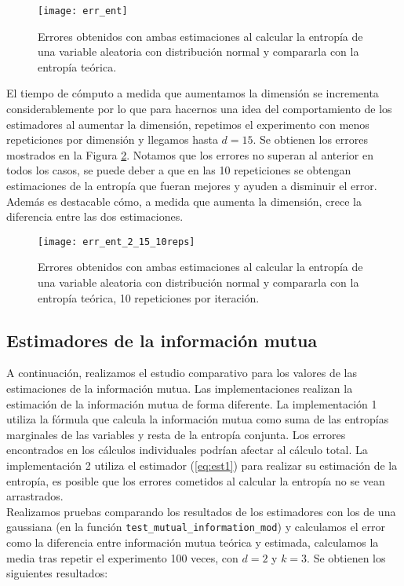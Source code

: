 \documentclass[12pt,a4paper]{report} %
\theoremstyle{definition}
\begin{document}
\begin{figure}[!htb]
    \centering
    \texttt{[image: err\_ent]}
    \caption{Errores obtenidos con ambas estimaciones al calcular la entropía de una variable aleatoria con distribución normal y compararla con la entropía teórica.}
    \label{fig:err_ent}
\end{figure}

El tiempo de cómputo a medida que aumentamos la dimensión se incrementa considerablemente por lo que para hacernos una idea del comportamiento de los estimadores al aumentar la dimensión, repetimos el experimento con menos repeticiones por dimensión y llegamos hasta $d = 15$. Se obtienen los errores mostrados en la Figura \ref{fig:err_ent15}. Notamos que los errores no superan al anterior en todos los casos, se puede deber a que en las 10 repeticiones se obtengan estimaciones de la entropía que fueran mejores y ayuden a disminuir el error. Además es destacable cómo, a medida que aumenta la dimensión, crece la diferencia entre las dos estimaciones.\\

\begin{figure}[H]
    \centering
    \texttt{[image: err\_ent\_2\_15\_10reps]}
    \caption{Errores obtenidos con ambas estimaciones al calcular la entropía de una variable aleatoria con distribución normal y compararla con la entropía teórica, 10 repeticiones por iteración.}
    \label{fig:err_ent15}
\end{figure}

\subsection{Estimadores de la información mutua}

A continuación, realizamos el estudio comparativo para los valores de las estimaciones de la información mutua. Las implementaciones realizan la estimación de la información mutua de forma diferente. La implementación 1 utiliza la fórmula que calcula la información mutua como suma de las entropías marginales de las variables y resta de la entropía conjunta. Los errores encontrados en los cálculos individuales podrían afectar al cálculo total. La implementación 2 utiliza el estimador (\ref{eq:est1}) para realizar su estimación de la entropía, es posible que los errores cometidos al calcular la entropía no se vean arrastrados.\\

Realizamos pruebas comparando los resultados de los estimadores con los de una gaussiana (en la función \texttt{test\_mutual\_information\_mod}) y calculamos el error como la diferencia entre información mutua teórica y estimada, calculamos la media tras repetir el experimento 100 veces, con $d=2$ y $k=3$. Se obtienen los siguientes resultados:\\
\end{document}
